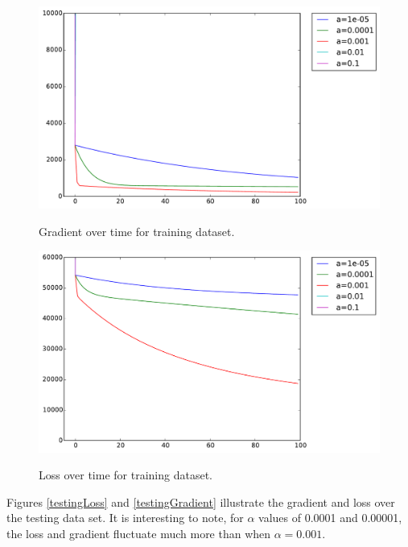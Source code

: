 \documentclass{article}
\begin{document}
    \begin{figure}[h]
      \begin{center}
      \includegraphics[scale=0.7]{trainingGradient.pdf}\\
      \end{center}
      \caption{Gradient over time for training dataset.}
      \label{trainingGradient}
    \end{figure}
    
    \begin{figure}[h]
      \begin{center}
      \includegraphics[scale=0.7]{trainingLoss.pdf}\\
      \end{center}
      \caption{Loss over time for training dataset.}
      \label{trainingLoss}
    \end{figure}

Figures \ref{testingLoss} and \ref{testingGradient} illustrate the gradient and loss over the testing data set. It is interesting to note, for $\alpha$ values of 0.0001 and 0.00001, the loss and gradient fluctuate much more than when $\alpha=0.001$.
\end{document}
